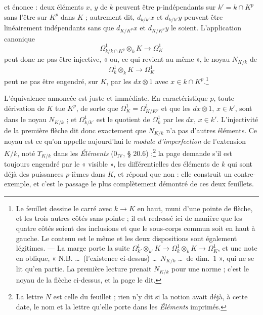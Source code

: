 \documentclass[11pt,a4paper]{article}
\begin{document}
et énonce : deux éléments $x$, $y$ de $k$ peuvent être p-indépendants sur
$k' = k \cap K^p$ sans l'être sur $K^p$ dans $K$ ; autrement dit, $d_{k/k'}x$
et $d_{k/k'}y$ peuvent être linéairement indépendants sans que $d_{K/K^p}x$ et
$d_{K/K^p}y$ le soient. L'application canonique
\[
  \Omega^{1}_{k/k \cap K^{p}} \otimes_{k} K \longrightarrow \Omega^{1}_{K}
\]
peut donc ne pas être injective, « ou, ce qui revient au même », le noyau
$N_{K/k}$ de
\[
  \Omega^{1}_{k} \otimes_{k} K \longrightarrow \Omega^{1}_{K}
\]
peut ne pas être engendré, sur $K$, par les $dx \otimes 1$ avec
$x \in k \cap K^p$.\footnote{Le feuillet dessine le carré avec $k \to K$ en
haut, muni d'une pointe de flèche, et les trois autres côtés sans pointe ; il
est redressé ici de manière que les quatre côtés soient des inclusions et que
le sous-corps commun soit en haut à gauche. Le contenu est le même et les deux
dispositions sont également légitimes. — La marge porte la suite
$\Omega^{1}_{k'} \otimes_{k'} K \to \Omega^{1}_{k} \otimes_{k} K \to
\Omega^{1}_{K}$, et une note en oblique, « N.B. \ldots\ (l'existence
ci-dessus) \ldots\ $N_{K/k}$ \ldots\ de dim.\ $1$ », qui ne se lit qu'en
partie. La première lecture prenait $N_{K/k}$ pour une norme ; c'est le noyau
de la flèche ci-dessus, et la page le dit.}

L'équivalence annoncée est juste et immédiate. En caractéristique $p$, toute
dérivation de $K$ tue $K^p$, de sorte que $\Omega^1_K = \Omega^1_{K/K^p}$ et
que les $dx \otimes 1$, $x \in k'$, sont dans le noyau $N_{K/k}$ ; et
$\Omega^1_{k/k'}$ est le quotient de $\Omega^1_k$ par les $dx$, $x \in k'$.
L'injectivité de la première flèche dit donc exactement que $N_{K/k}$ n'a pas
d'autres éléments. Ce noyau est ce qu'on appelle aujourd'hui le \emph{module
d'imperfection} de l'extension $K/k$, noté $\Upsilon_{K/k}$ dans les
\emph{Éléments} (0$_{\mathrm{IV}}$, § 20.6) ;\footnote{La lettre $N$ est celle
du feuillet ; rien n'y dit si la notion avait déjà, à cette date, le nom et la
lettre qu'elle porte dans les \emph{Éléments} imprimés.} la page demande s'il
est toujours engendré par le « visible », les différentielles des éléments de
$k$ qui sont déjà des puissances $p$-ièmes dans $K$, et répond que non : elle
construit un contre-exemple, et c'est le passage le plus complètement démontré
de ces deux feuillets.
\end{document}
